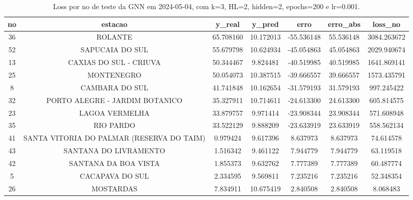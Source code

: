 \begin{table}[h]
\centering
\caption{Loss por no de teste da GNN em 2024-05-04, com k=3, HL=2, hidden=2, epochs=200 e lr=0.001.}
\label{tab:gnn_loss_k3_hl2_h2_e200_d20240504}
\begin{tabular}{ccccccc}
\toprule
no & estacao & y\_real & y\_pred & erro & erro\_abs & loss\_no \\
\midrule
36 & ROLANTE & 65.708160 & 10.172013 & -55.536148 & 55.536148 & 3084.263672 \\
52 & SAPUCAIA DO SUL & 55.679798 & 10.624934 & -45.054863 & 45.054863 & 2029.940674 \\
13 & CAXIAS DO SUL - CRIUVA & 50.344467 & 9.824481 & -40.519985 & 40.519985 & 1641.869141 \\
25 & MONTENEGRO & 50.054073 & 10.387515 & -39.666557 & 39.666557 & 1573.435791 \\
8 & CAMBARA DO SUL & 41.741848 & 10.162654 & -31.579193 & 31.579193 & 997.245422 \\
32 & PORTO ALEGRE - JARDIM BOTANICO & 35.327911 & 10.714611 & -24.613300 & 24.613300 & 605.814575 \\
23 & LAGOA VERMELHA & 33.879757 & 9.971414 & -23.908344 & 23.908344 & 571.608948 \\
35 & RIO PARDO & 33.522129 & 9.888209 & -23.633919 & 23.633919 & 558.562134 \\
41 & SANTA VITORIA DO PALMAR (RESERVA DO TAIM) & 0.979424 & 9.617396 & 8.637973 & 8.637973 & 74.614578 \\
43 & SANTANA DO LIVRAMENTO & 1.516342 & 9.461122 & 7.944779 & 7.944779 & 63.119518 \\
42 & SANTANA DA BOA VISTA & 1.855373 & 9.632762 & 7.777389 & 7.777389 & 60.487774 \\
5 & CACAPAVA DO SUL & 2.334595 & 9.569811 & 7.235216 & 7.235216 & 52.348354 \\
26 & MOSTARDAS & 7.834911 & 10.675419 & 2.840508 & 2.840508 & 8.068483 \\
\bottomrule
\end{tabular}
\end{table}
